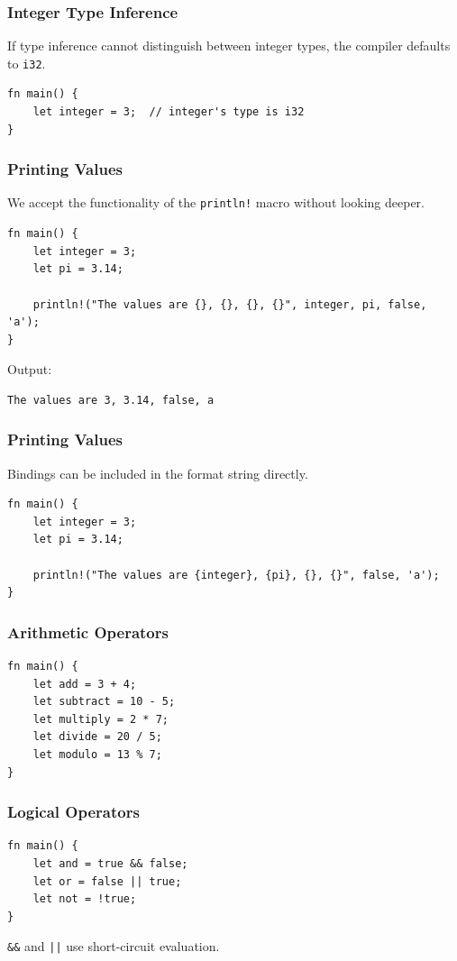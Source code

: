 \begin{frame}[fragile]
    \frametitle{Integer Type Inference}
    If type inference cannot distinguish between integer types, the compiler defaults to \texttt{i32}.
    \pause
    \vfill
    \begin{verbatim}
fn main() {
    let integer = 3;  // integer's type is i32
}
    \end{verbatim}
\end{frame}

\begin{frame}[fragile]
    \frametitle{Printing Values}
    We accept the functionality of the \texttt{println!} macro without looking deeper.
    \pause
    \vfill
    \begin{verbatim}
fn main() {
    let integer = 3;
    let pi = 3.14;

    println!("The values are {}, {}, {}, {}", integer, pi, false, 'a');
}
    \end{verbatim}
    \pause
    \vfill
    Output:
    \begin{verbatim}
The values are 3, 3.14, false, a
    \end{verbatim}
\end{frame}

\begin{frame}[fragile]
    \frametitle{Printing Values}
    Bindings can be included in the format string directly.
    \pause
    \vfill
    \begin{verbatim}
fn main() {
    let integer = 3;
    let pi = 3.14;

    println!("The values are {integer}, {pi}, {}, {}", false, 'a');
}
    \end{verbatim}
\end{frame}

\begin{frame}[fragile]
    \frametitle{Arithmetic Operators}
    \begin{verbatim}
fn main() {
    let add = 3 + 4;
    let subtract = 10 - 5;
    let multiply = 2 * 7;
    let divide = 20 / 5;
    let modulo = 13 % 7;
}
    \end{verbatim}
\end{frame}

\begin{frame}[fragile]
    \frametitle{Logical Operators}
    \begin{verbatim}
fn main() {
    let and = true && false;
    let or = false || true;
    let not = !true;
}
    \end{verbatim}
    \pause
    \vfill
    \texttt{\&\&} and \texttt{||} use short-circuit evaluation.
\end{frame}

